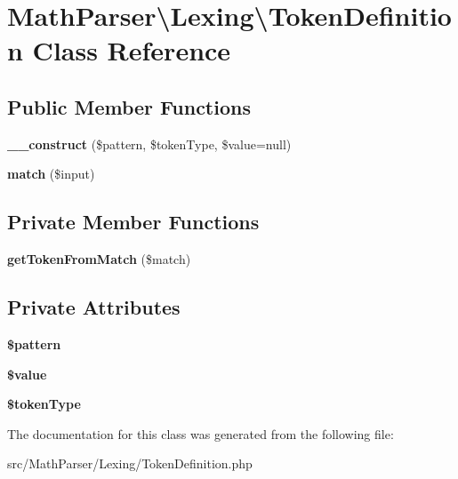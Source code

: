\hypertarget{classMathParser_1_1Lexing_1_1TokenDefinition}{\section{Math\-Parser\textbackslash{}Lexing\textbackslash{}Token\-Definition Class Reference}
\label{classMathParser_1_1Lexing_1_1TokenDefinition}
}
\subsection*{Public Member Functions}
\begin{DoxyCompactItemize}
\item 
\hypertarget{classMathParser_1_1Lexing_1_1TokenDefinition_a1e303313d24845e715750416ac6f829a}{{\bfseries \-\_\-\-\_\-construct} (\$pattern, \$token\-Type, \$value=null)}\label{classMathParser_1_1Lexing_1_1TokenDefinition_a1e303313d24845e715750416ac6f829a}

\item 
\hypertarget{classMathParser_1_1Lexing_1_1TokenDefinition_a6fbea2374195a9ede9bc01c097af16ec}{{\bfseries match} (\$input)}\label{classMathParser_1_1Lexing_1_1TokenDefinition_a6fbea2374195a9ede9bc01c097af16ec}

\end{DoxyCompactItemize}
\subsection*{Private Member Functions}
\begin{DoxyCompactItemize}
\item 
\hypertarget{classMathParser_1_1Lexing_1_1TokenDefinition_a2f4ffbafe4f5f613ac52e02b31822d7c}{{\bfseries get\-Token\-From\-Match} (\$match)}\label{classMathParser_1_1Lexing_1_1TokenDefinition_a2f4ffbafe4f5f613ac52e02b31822d7c}

\end{DoxyCompactItemize}
\subsection*{Private Attributes}
\begin{DoxyCompactItemize}
\item 
\hypertarget{classMathParser_1_1Lexing_1_1TokenDefinition_acfea1a6b7d04da3e5fca0ef67fa804a8}{{\bfseries \$pattern}}\label{classMathParser_1_1Lexing_1_1TokenDefinition_acfea1a6b7d04da3e5fca0ef67fa804a8}

\item 
\hypertarget{classMathParser_1_1Lexing_1_1TokenDefinition_a6658afba1a8540a8a9f2c8df268ad386}{{\bfseries \$value}}\label{classMathParser_1_1Lexing_1_1TokenDefinition_a6658afba1a8540a8a9f2c8df268ad386}

\item 
\hypertarget{classMathParser_1_1Lexing_1_1TokenDefinition_ae5dacb8bc549085fd49a815fb2a07bc5}{{\bfseries \$token\-Type}}\label{classMathParser_1_1Lexing_1_1TokenDefinition_ae5dacb8bc549085fd49a815fb2a07bc5}

\end{DoxyCompactItemize}


The documentation for this class was generated from the following file\-:\begin{DoxyCompactItemize}
\item 
src/\-Math\-Parser/\-Lexing/Token\-Definition.\-php\end{DoxyCompactItemize}
